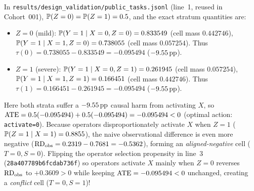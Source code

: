 \begin{workedexample}
In \texttt{results/design\_validation/public\_tasks.jsonl} (line~1, reused in Cohort~001), $\mathbb{P}(Z=0)=\mathbb{P}(Z=1)=0.5$, and the exact stratum quantities are:
\begin{itemize}
  \item $Z=0$ (mild): $\mathbb{P}(Y=1\mid X=0,Z=0)=0.833549$ (cell mass $0.442746$), $\mathbb{P}(Y=1\mid X=1,Z=0)=0.738055$ (cell mass $0.057254$). Thus $\tau(0) = 0.738055 - 0.833549 = -0.095494$ ($-9.55\,\mathrm{pp}$).
  \item $Z=1$ (severe): $\mathbb{P}(Y=1\mid X=0,Z=1)=0.261945$ (cell mass $0.057254$), $\mathbb{P}(Y=1\mid X=1,Z=1)=0.166451$ (cell mass $0.442746$). Thus $\tau(1) = 0.166451 - 0.261945 = -0.095494$ ($-9.55\,\mathrm{pp}$).
\end{itemize}
Here both strata suffer a $-9.55\,\mathrm{pp}$ causal harm from activating $X$, so $\mathrm{ATE} = 0.5(-0.095494) + 0.5(-0.095494) = -0.095494 < 0$ (optimal action: \texttt{activate=0}). Because operators disproportionately activate $X$ when $Z=1$ ($\mathbb{P}(Z=1\mid X=1) = 0.8855$), the naive observational difference is even more negative ($\mathrm{RD}_{\mathrm{obs}} = 0.2319 - 0.7681 = -0.5362$), forming an \emph{aligned-negative} cell ($T=0, S=0$). Flipping the operator selection propensity in line~3 (\texttt{28a407789b6fcdab736f}) so operators activate $X$ mainly when $Z=0$ reverses $\mathrm{RD}_{\mathrm{obs}}$ to $+0.3609 > 0$ while keeping $\mathrm{ATE} = -0.095494 < 0$ unchanged, creating a \emph{conflict} cell ($T=0, S=1$)!
\end{workedexample}

